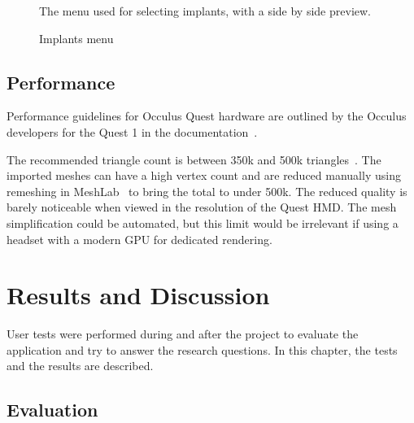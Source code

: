 \documentclass[a4paper]{report}
\begin{document}
\begin{figure}[h!]
    \centering
	\hfill
	\caption{Implants menu}\label{implantsmenu}
  \small
  The menu used for selecting implants, with a side by side preview.
\end{figure}

\section{Performance}
Performance guidelines for Occulus Quest hardware are outlined by the Occulus developers for the Quest 1 in the documentation~\cite{noauthor_oculus_nodate}.

The recommended triangle count is between 350k and 500k triangles~\cite{noauthor_performance_nodate}. The imported meshes can have a high vertex count and are reduced manually using remeshing in MeshLab~\cite{cignoni_meshlab_2008} to bring the total to under 500k. The reduced quality is barely noticeable when viewed in the resolution of the Quest HMD.
The mesh simplification could be automated, but this limit would be irrelevant if using a headset with a modern GPU for dedicated rendering.




\chapter{Results and Discussion}

User tests were performed during and after the project to evaluate the application and try to answer the research questions. In this chapter, the tests and the results are described.

\section{Evaluation}
\end{document}
